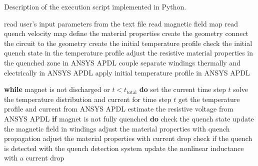 \begin{algorithm}[H]
  \caption{Description of the execution script implemented in Python.}
  \label{alg:execution_script}
  \begin{algorithmic}[1]
    \STATE read user's input parameters from the text file
    \STATE read magnetic field map
    \STATE read quench velocity map
    \color{red} \STATE  define the material properties
    \STATE create the geometry 
    \STATE connect the circuit to the geometry
    \STATE create the initial temperature profile
    \STATE check the initial quench state in the temperature profile
    \STATE adjust the resistive material properties in the quenched zone in ANSYS APDL
    \STATE couple separate windings thermally and electrically in ANSYS APDL
    \color{blue} \STATE apply initial temperature profile in ANSYS APDL
    
    \color{black} \STATE \textbf{while} magnet is not discharged or $t < t_\text{total}$ \textbf{do}
        \color{blue} \STATE \hspace{0.5cm} set the current time step $t$
        \STATE \hspace{0.5cm} solve the temperature distribution and current for time step $t$
        \color{ForestGreen} \STATE \hspace{0.5cm} get the temperature profile and current from ANSYS APDL
        \STATE \hspace{0.5cm} estimate the resistive voltage from ANSYS APDL
        \STATE \hspace{0.5cm} \textbf{if} magnet is not fully quenched \textbf{do}
        \STATE \hspace{1.5cm} check the quench state
        \STATE \hspace{1.5cm} update the magnetic field in windings
        \color{red} \STATE \hspace{1.5cm} adjust the material properties with quench propagation
        \color{red} \STATE \hspace{0.5cm} adjust the material properties with current drop
        \STATE \hspace{0.5cm} check if the quench is detected with the quench detection system
        \STATE \hspace{0.5cm} update the nonlinear inductance with a current drop
  \end{algorithmic}
\end{algorithm}
